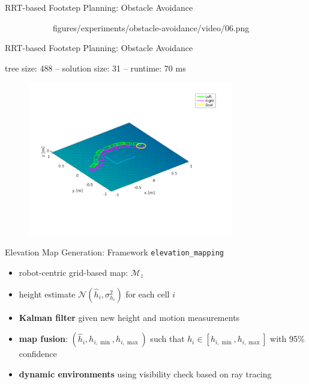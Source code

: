 \documentclass[10pt]{beamer}
\begin{document}
\begin{frame}{RRT-based Footstep Planning: Obstacle Avoidance}
\begin{figure}
\begin{subfigure}{0.40\textwidth}
				{figures/experiments/obstacle-avoidance/video/06.png}
		\end{subfigure}
	\end{figure}
\end{frame}

\begin{frame}{RRT-based Footstep Planning: Obstacle Avoidance}
	\begin{center}
    tree size: 488 -- solution size: 31 -- runtime: 70 ms
  \end{center}
	\begin{figure}
		\centering
		\includegraphics[width=0.8\textwidth]
				{figures/experiments/obstacle-avoidance/footstep-plan.pdf}
	\end{figure}
\end{frame}

\begin{frame}{Elevation Map Generation: Framework}
	\texttt{elevation\_mapping}
  \begin{itemize}
		\item robot-centric grid-based map: $\mathcal{M}_z$
		\item height estimate $\mathcal{N}(\hat{h}_i, \sigma_{h_i}^2)$
				for each cell $i$
		\item \textbf{Kalman filter} given new height and motion measurements
		\item \textbf{map fusion}: $(\hat{h}_i, h_{i,\min}, h_{i,\max})$ such that
				$h_i \in [h_{i,\min}, h_{i,\max}]$ with 95\% confidence
		\item \textbf{dynamic environments} using visibility check based
				on ray tracing
	\end{itemize}
\end{frame}
\end{document}
